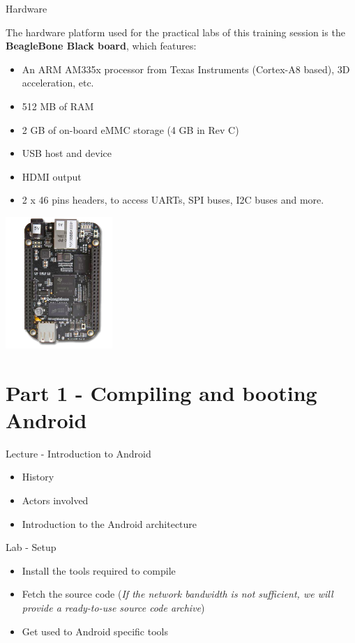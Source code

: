 \documentclass[a4paper,12pt,obeyspaces,spaces,hyphens]{article}
\begin{document}
\feagendatwocolumn
{Hardware}
{
  The hardware platform used for the practical labs of this training
  session is the {\bf BeagleBone Black board}, which features:

  \begin{itemize}
  \item An ARM AM335x processor from Texas Instruments (Cortex-A8
    based), 3D acceleration, etc.
  \item 512 MB of RAM
  \item 2 GB of on-board eMMC storage
        \newline(4 GB in Rev C)
  \item USB host and device
  \item HDMI output
  \item 2 x 46 pins headers, to access UARTs, SPI buses, I2C buses
    and more.
  \end{itemize}
}
{}
{
  \begin{center}
    \includegraphics[height=5cm]{agenda/beagleboneblack.png}
  \end{center}
}

\section{Part 1 - Compiling and booting Android}

\feagendatwocolumn
{Lecture - Introduction to Android}
{
  \begin{itemize}
  \item History
  \item Actors involved
  \item Introduction to the Android architecture
  \end{itemize}
}
{Lab - Setup}
{
  \begin{itemize}
  \item Install the tools required to compile
  \item Fetch the source code (\textit{If the network bandwidth is not
      sufficient, we will provide a ready-to-use source code archive})
  \item Get used to Android specific tools
  \end{itemize}
}
\end{document}
